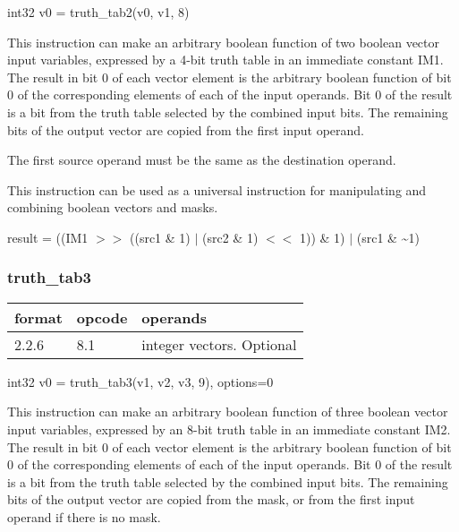 \documentclass[forwardcom.tex]{subfiles}
\begin{document}
int32 v0 = truth\_tab2(v0, v1, 8)
\vspace{2mm}

This instruction can make an arbitrary boolean function of two boolean vector input variables, expressed by a 4-bit truth table in an immediate constant IM1. The result in bit 0 of each vector element is the arbitrary boolean function of bit 0 of the corresponding elements of each of the input operands. Bit 0 of the result is a bit from the truth table selected by the combined input bits. The remaining bits of the output vector are copied from the first input operand. 
\vspace{2mm}

The first source operand must be the same as the destination operand.
\vspace{2mm}

This instruction can be used as a universal instruction for manipulating and combining boolean vectors and masks.
\vspace{2mm}

result = ((IM1 $>>$ ((src1 \& 1) $|$ (src2 \& 1) $<<$ 1)) \& 1) $|$ (src1 \& \~{}1)

\subsubsection{truth\_tab3}
\label{table:truthTab3Instruction}
\begin{tabular}{|p{12mm}|p{12mm}|p{110mm}|}
\hline
\bfseries format & \bfseries opcode & \bfseries operands \\ \hline
2.2.6 & 8.1 & integer vectors. Optional \\ \hline
\end{tabular}
\vspace{2mm}

int32 v0 = truth\_tab3(v1, v2, v3, 9), options=0
\vspace{2mm}

This instruction can make an arbitrary boolean function of three boolean vector input variables, expressed by an 8-bit truth table in an immediate constant IM2. The result in bit 0 of each vector element is the arbitrary boolean function of bit 0 of the corresponding elements of each of the input operands. Bit 0 of the result is a bit from the truth table selected by the combined input bits. The remaining bits of the output vector are copied from the mask, or from the first input operand if there is no mask.
\vspace{2mm}
\end{document}
